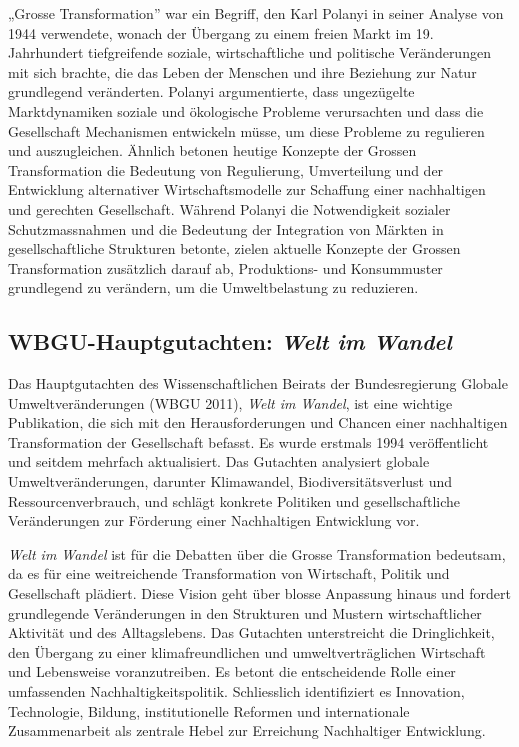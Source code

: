 \documentclass[
  nswissgerman,
  a4paper,
  DIV=11,
  numbers=noendperiod,
  oneside,
  openany]{scrreprt}
\begin{document}
„Grosse Transformation'' war ein Begriff, den Karl Polanyi in seiner
Analyse von 1944 verwendete, wonach der Übergang zu einem freien Markt
im 19. Jahrhundert tiefgreifende soziale, wirtschaftliche und politische
Veränderungen mit sich brachte, die das Leben der Menschen und ihre
Beziehung zur Natur grundlegend veränderten. Polanyi argumentierte, dass
ungezügelte Marktdynamiken soziale und ökologische Probleme verursachten
und dass die Gesellschaft Mechanismen entwickeln müsse, um diese
Probleme zu regulieren und auszugleichen. Ähnlich betonen heutige
Konzepte der Grossen Transformation die Bedeutung von Regulierung,
Umverteilung und der Entwicklung alternativer Wirtschaftsmodelle zur
Schaffung einer nachhaltigen und gerechten Gesellschaft. Während Polanyi
die Notwendigkeit sozialer Schutzmassnahmen und die Bedeutung der
Integration von Märkten in gesellschaftliche Strukturen betonte, zielen
aktuelle Konzepte der Grossen Transformation zusätzlich darauf ab,
Produktions- und Konsummuster grundlegend zu verändern, um die
Umweltbelastung zu reduzieren.

\subsection{\texorpdfstring{WBGU-Hauptgutachten: \emph{Welt im
Wandel}}{WBGU-Hauptgutachten: Welt im Wandel}}\label{wbgu-hauptgutachten-welt-im-wandel}

Das Hauptgutachten des Wissenschaftlichen Beirats der Bundesregierung
Globale Umweltveränderungen (WBGU 2011), \emph{Welt im Wandel}, ist eine
wichtige Publikation, die sich mit den Herausforderungen und Chancen
einer nachhaltigen Transformation der Gesellschaft befasst. Es wurde
erstmals 1994 veröffentlicht und seitdem mehrfach aktualisiert. Das
Gutachten analysiert globale Umweltveränderungen, darunter Klimawandel,
Biodiversitätsverlust und Ressourcenverbrauch, und schlägt konkrete
Politiken und gesellschaftliche Veränderungen zur Förderung einer
Nachhaltigen Entwicklung vor.

\emph{Welt im Wandel} ist für die Debatten über die Grosse
Transformation bedeutsam, da es für eine weitreichende Transformation
von Wirtschaft, Politik und Gesellschaft plädiert. Diese Vision geht
über blosse Anpassung hinaus und fordert grundlegende Veränderungen in
den Strukturen und Mustern wirtschaftlicher Aktivität und des
Alltagslebens. Das Gutachten unterstreicht die Dringlichkeit, den
Übergang zu einer klimafreundlichen und umweltverträglichen Wirtschaft
und Lebensweise voranzutreiben. Es betont die entscheidende Rolle einer
umfassenden Nachhaltigkeitspolitik. Schliesslich identifiziert es
Innovation, Technologie, Bildung, institutionelle Reformen und
internationale Zusammenarbeit als zentrale Hebel zur Erreichung
Nachhaltiger Entwicklung.
\end{document}
